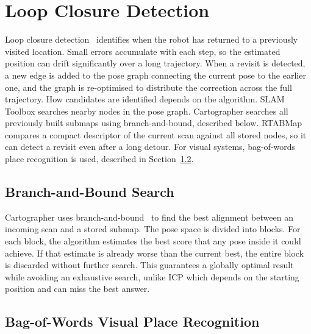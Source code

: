 \section{Loop Closure Detection}
\label{sec:loop_closure}

Loop closure detection~\cite{cadena2016past} identifies when the robot has
returned to a previously visited location.
Small errors accumulate with each step, so the estimated position can drift
significantly over a long trajectory.
When a revisit is detected, a new edge is added to the pose graph connecting
the current pose to the earlier one, and the graph is re-optimised to
distribute the correction across the full trajectory.
How candidates are identified depends on the algorithm.
SLAM Toolbox searches nearby nodes in the pose graph.
Cartographer searches all previously built submaps using branch-and-bound,
described below.
RTABMap compares a compact descriptor of the current scan against all stored
nodes, so it can detect a revisit even after a long detour.
For visual systems, bag-of-words place recognition is used, described in
Section~\ref{sec:bow}.

\subsection{Branch-and-Bound Search}

Cartographer uses branch-and-bound~\cite{hess2016cartographer} to find the
best alignment between an incoming scan and a stored submap.
The pose space is divided into blocks.
For each block, the algorithm estimates the best score that any pose inside
it could achieve.
If that estimate is already worse than the current best, the entire block is
discarded without further search.
This guarantees a globally optimal result while avoiding an exhaustive search,
unlike ICP which depends on the starting position and can miss the best answer.


\subsection{Bag-of-Words Visual Place Recognition}
\label{sec:bow}

